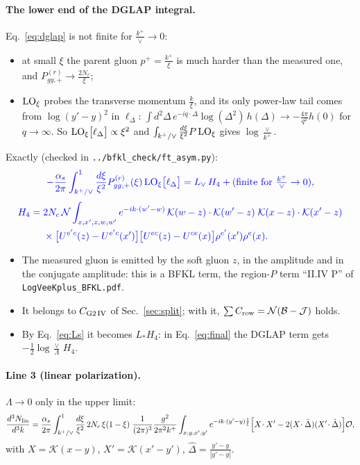 \documentclass[10pt]{article}
\numberwithin{equation}{section}
\newcommand{\new}[1]{{\color{blue}#1}}
\newcommand{\Lv}{L_{\vee}}
\newcommand{\Ls}{L_{*}}
\newcommand{\OO}{\mathcal O}
\newcommand{\KK}{\mathcal K}
\newcommand{\JJ}{\mathcal J}
\newcommand{\BB}{\mathcal B}
\newcommand{\NN}{\mathcal N}
\newcommand{\Dh}{\hat\Delta}
\newcommand{\LOx}[1]{{\rm LO}_\xi\big[#1\big]}
\newcommand{\pre}{\frac{1}{(2\pi)^3}}
\newcommand{\phw}{e^{-ik\cdot(w'-w)}}
\begin{document}
\paragraph{\new{The lower end of the DGLAP integral.}} \new{Eq.~\eqref{eq:dglap} is not finite for $\frac{k^+}{\vee}\to0$:}
\begin{itemize}
\item \new{at small $\xi$ the parent gluon $p^+=\frac{k^+}{\xi}$ is much harder than the measured one, and $P^{(r)}_{gg,+}\to\frac{2N_c}{\xi}$;}
\item \new{${\rm LO}_\xi$ probes the transverse momentum $\frac{k}{\xi}$, and its only power-law tail comes from $\log(y'-y)^2$ in $\ell_\Delta$: $\int d^2\Delta\,e^{-iq\cdot\Delta}\log(\Delta^2)\,h(\Delta)\to-\frac{4\pi}{q^2}h(0)$ for $q\to\infty$. So $\LOx{\ell_\Delta}\propto\xi^2$ and $\int_{k^+/\vee}\frac{d\xi}{\xi^2}P\,{\rm LO}_\xi$ gives $\log\frac{\vee}{k^+}$.}
\end{itemize}
\new{Exactly (checked in \texttt{../bfkl\_check/ft\_asym.py}):}
\begin{equation}
\new{-\frac{\alpha_s}{2\pi}\int_{k^+/\vee}^1\frac{d\xi}{\xi^2}P^{(r)}_{gg,+}(\xi)\,\LOx{\ell_\Delta}=\Lv\,H_4+(\text{finite for }\tfrac{k^+}{\vee}\to0),}
\end{equation}
\begin{equation}
\new{\begin{aligned}H_4={}&2N_c\,\NN\int_{x,x',z,w,w'}\phw\,\KK(w-z)\cdot\KK(w'-z)\;\KK(x-z)\cdot\KK(x'-z)\\&\times\big[U^{e'c}(z)-U^{e'c}(x')\big]\big[U^{ec}(z)-U^{ce}(x)\big]\rho^{e'}(x')\rho^e(x).\end{aligned}}
\label{eq:H4}
\end{equation}
\begin{itemize}
\item \new{The measured gluon is emitted by the soft gluon $z$, in the amplitude and in the conjugate amplitude: this is a BFKL term, the region-$P$ term ``II.IV P'' of \texttt{LogVeeKplus\_BFKL.pdf}.}
\item \new{It belongs to $C_{\rm G2\,IV}$ of Sec.~\ref{sec:split}; with it, $\sum C_{\rm row}=\NN(\BB-\JJ)$ holds.}
\item \new{By Eq.~\eqref{eq:Ls} it becomes $\Ls H_4$: in Eq.~\eqref{eq:final} the DGLAP term gets $-\frac12\log\frac\vee\Lambda\,H_4$.}
\end{itemize}
\paragraph{Line 3 (linear polarization).} $\Lambda\to0$ only in the upper limit:
\begin{equation}
\frac{d^3N_{\rm lin}}{d^3k}=\frac{\alpha_s}{2\pi}\int_{k^+/\vee}^1\frac{d\xi}{\xi^2}\,2N_c\,\xi(1-\xi)\;\pre\frac{g^2}{2\pi^2k^+}\int_{x,y,x',y'}e^{-ik\cdot(y'-y)\frac1\xi}\Big[X\!\cdot X'-2(X\!\cdot\Dh)(X'\!\cdot\Dh)\Big]\OO,
\label{eq:lin}
\end{equation}
with $X=\KK(x-y)$, $X'=\KK(x'-y')$, $\Dh=\frac{y'-y}{|y'-y|}$.
\end{document}
